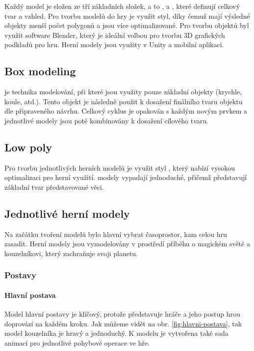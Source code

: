 Každý model je složen ze tří základních složek, a to ,  a , které definují celkový tvar a vzhled. Pro tvorbu modelů do hry je využit \cite{LowPoly} styl, díky čemuž mají výsledné objekty menší počet polygonů a jsou více optimalizované. Pro tvorbu objektů byl využit software Blender, který je ideální volbou pro tvorbu 3D grafických podkladů pro hru. Herní modely jsou využity v Unity a mobilní aplikaci.

\subsection{Box modeling}
\cite{BoxModeling} je technika modelování, při které jsou využity pouze základní objekty (krychle, koule, atd.). Tento objekt je následně použit k dosažení finálního tvaru objektu dle připraveného návrhu. Celkový cyklus je opakován s každým novým prvkem a jednotlivé modely jsou poté kombinovány k dosažení cílového tvaru.

\subsection{Low poly}
Pro tvorbu jednotlivých herních modelů je využit styl \cite{LowPoly}, který nabízí vysokou optimalizaci pro herní využití.  modely vypadají jednoduché, přičemž představují základní tvar představované věci.

\subsection{Jednotlivé herní modely}
Na začátku tvoření modelů bylo hlavní vybrat časoprostor, kam celou hru zasadit. Herní modely jsou vymodelovány v prostředí příběhu o magickém světě a kouzelníkovi, který zachraňuje svoji planetu.

\subsubsection{Postavy}
\paragraph{Hlavní postava}
Model hlavní postavy je klíčový, protože představuje hráče a jeho postup hrou doprovází na každém kroku. Jak můžeme vidět na obr. \ref{fig:hlavni-postava}, tak model kouzelníka je hravý a jednoduchý. K modelu je vytvořena také sada animací pro jednotlivé pohybové operace ve hře.

